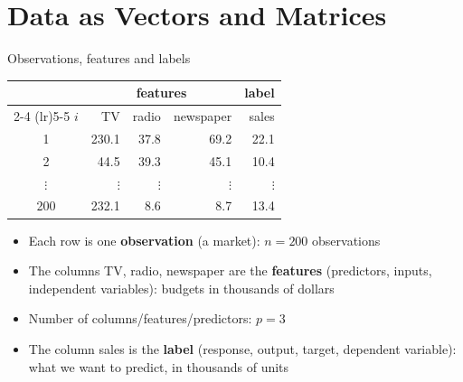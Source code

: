 \section{Data as Vectors and Matrices}


\begin{frame}{Observations, features and labels}
    \begin{center}
        \small
        \begin{tabular}{crrrr}
            \toprule
            & \multicolumn{3}{c}{features} & label \\
            \cmidrule(lr){2-4} \cmidrule(lr){5-5}
            $i$ & TV & radio & newspaper & sales \\
            \midrule
            1 & 230.1 & 37.8 & 69.2 & 22.1 \\
            2 & 44.5 & 39.3 & 45.1 & 10.4 \\
            $\vdots$ & $\vdots$ & $\vdots$ & $\vdots$ & $\vdots$ \\
            200 & 232.1 & 8.6 & 8.7 & 13.4 \\
            \bottomrule
        \end{tabular}
    \end{center}
    \begin{itemize}
        \item Each row is one \textbf{observation} (a market): $n = 200$ observations
        \item The columns TV, radio, newspaper are the \textbf{features} (predictors, inputs, independent variables): budgets in thousands of dollars
        \item Number of columns/features/predictors:  $p = 3$
        \item The column sales is the \textbf{label} (response, output, target, dependent variable): what we want to predict, in thousands of units
    \end{itemize}
\end{frame}


